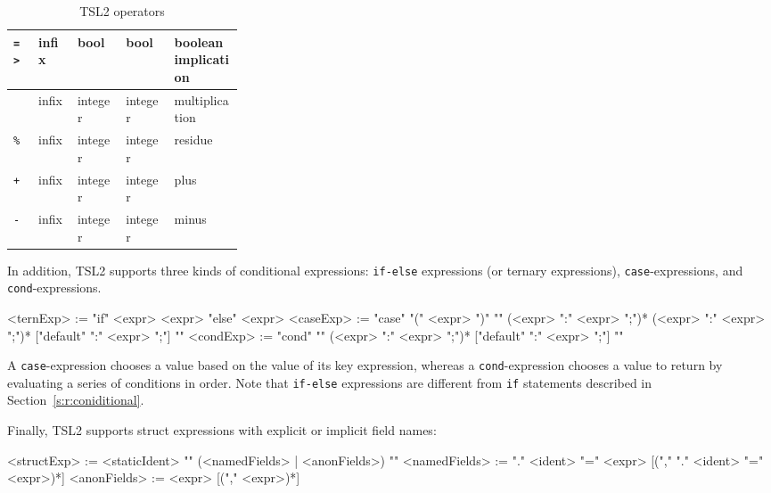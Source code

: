 \documentclass{report}
\newcommand{\src}[1]{\texttt{#1}}
\newcommand{\tsl}{TSL2 }
\begin{document}
\begin{table}
\begin{small}
\begin{tabular}{|l|l|l|l|p{0.3\linewidth}|}
    \hline    
    {\tt\verb#=>#}                   & infix   & bool           & bool           & boolean implication\\
    \hline    
    {\tt*}                           & infix   & integer        & integer        & multiplication \\
    \hline    
    {\tt\%}                          & infix   & integer        & integer        & residue \\
    \hline    
    {\tt+}                           & infix   & integer        & integer        & plus \\
    \hline    
    {\tt-}                           & infix   & integer        & integer        & minus \\
    \hline
\end{tabular}
\end{small}
\caption{\tsl operators}\label{t:ops}
\end{table}

In addition, \tsl supports three kinds of conditional expressions: 
\src{if-else} expressions (or ternary expressions), 
\src{case}-expressions, and \src{cond}-expressions.  

\begin{bnflisting}{}
<ternExp> := "if" <expr> <expr> "else" <expr>
<caseExp> := "case" "(" <expr> ")" "{" (<expr> ":" <expr> ";")* 
                 (<expr> ":" <expr> ";")* 
                 ["default" ":" <expr> ";"]
            "}"
<condExp> := "cond" "{"
                  (<expr>    ":" <expr> ";")*
                  ["default" ":" <expr> ";"]
              "}"
\end{bnflisting}

A \src{case}-expression chooses a value based on the value of its 
key expression, whereas a \src{cond}-expression chooses a value to 
return by evaluating a series of conditions in order.  Note that 
\src{if-else} expressions are different from \src{if} statements 
described in Section~\ref{s:r:coniditional}.

Finally, \tsl supports struct expressions with explicit or implicit 
field names:

\begin{bnflisting}{}
<structExp>   := <staticIdent> "{" 
                     (<namedFields> | <anonFields>) 
                 "}"
<namedFields> := "." <ident> "=" <expr> 
                 [("," "." <ident> "=" <expr>)*]
<anonFields> := <expr> 
                 [("," <expr>)*]
\end{bnflisting}
\end{document}
